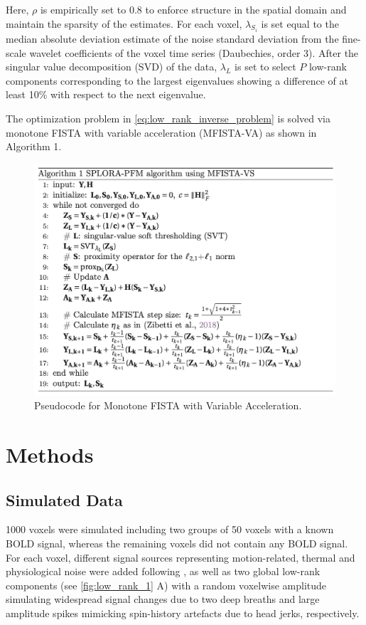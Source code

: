 Here, $\rho$ is empirically set to 0.8 to enforce structure in the spatial
domain and maintain the sparsity of the estimates. For each voxel,
$\lambda_{S_i}$ is set equal to the median absolute deviation estimate  of the
noise standard deviation from the fine-scale wavelet coefficients of the voxel
time series (Daubechies, order 3). After the singular value decomposition
(SVD) of the data, $\lambda_L$ is set to select $P$ low-rank
components corresponding to the largest eigenvalues showing a difference of at
least 10\% with respect to the next eigenvalue. 

The optimization problem in \cref{eq:low_rank_inverse_problem} is solved via
monotone FISTA with variable acceleration (MFISTA-VA)
\citep{Zibetti2018MonotoneFISTAvariable} as shown in Algorithm 1.

\begin{figure}[th!]
    \centering
    \includegraphics[width=\textwidth]{figures/low_rank/algorithm.png}
    \caption{Pseudocode for Monotone FISTA with Variable Acceleration.}
    \label{fig:algorithm}
\end{figure}

\setlength{\textfloatsep}{10pt}%

\section{Methods}
\label{sec:low_rank_methods}

\subsection{Simulated Data}
1000 voxels were simulated including two groups of 50 voxels with a known BOLD
signal, whereas the remaining voxels did not contain any BOLD signal. For each
voxel, different signal sources representing motion-related, thermal and
physiological noise were added following \citep{Gaudes2013Paradigmfreemapping},
as well as two global low-rank components (see \cref{fig:low_rank_1} A) with a
random voxelwise amplitude simulating widespread signal changes due to two deep
breaths \citep{Power2018RiddingfMRIdata} and large amplitude spikes mimicking
spin-history artefacts due to head jerks, respectively. 

